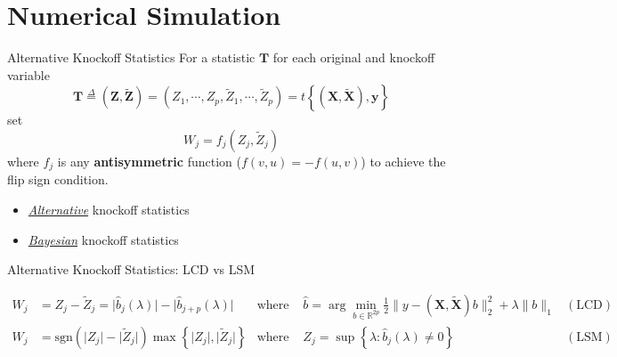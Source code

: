 \section{Numerical Simulation}

\frame{\sectionpage}

\begin{frame}{Alternative Knockoff Statistics}
    \small
    For a statistic $\mathbf{T}$ for each original and knockoff variable $$ \mathbf{T} \overset{\Delta}{=} (\mathbf{Z},\tilde{\mathbf{Z}}) = (Z_1,\cdots,Z_p,\tilde{Z}_1,\cdots,\tilde{Z}_p) = t\left\{ (\mathbf{X},\tilde{\mathbf{X}}), \mathbf{y}\right\} $$
    set $$W_j = f_j(Z_j,\tilde{Z}_j)$$ where $f_j$ is any \textcolor{glaucous!65!white}{\textbf{antisymmetric}} function (\underline{$f(v,u)=-f(u,v)$}) to achieve the flip sign condition.

    \vspace*{5pt}
    \normalsize
    \begin{itemize}
        \item<2-> \textit{\underline{Alternative}} knockoff statistics 
        \item<2-> \textit{\underline{Bayesian}} knockoff statistics
    \end{itemize}
\end{frame}

\begin{frame}{Alternative Knockoff Statistics: LCD vs LSM}
    
    {\footnotesize \begin{align*}
        W_j &= Z_j -\tilde{Z}_j = \lvert \hat{b}_j(\lambda) \rvert - \lvert \hat{b}_{j+p}(\lambda) \rvert & \text{where } &\hat{b} = \arg\min_{b\in\mathbb{R}^{2p}}\frac{1}{2}\lVert y - (\mathbf{X},\tilde{\mathbf{X}})b \rVert^2_2 + \lambda \lVert b \rVert _1 & (\mathrm{LCD})\\
        W_j &=\mathrm{sgn}(\lvert Z_j \rvert-\lvert \tilde{Z}_j \rvert)\max\left\{ \lvert Z_j \rvert,\lvert \tilde{Z}_j \rvert \right\} & \text{where } &Z_j = \sup \left\{ \lambda:\hat{b}_j(\lambda)\neq 0 \right\} & (\mathrm{LSM})
    \end{align*}}

    \vspace*{5pt}
\end{frame}


